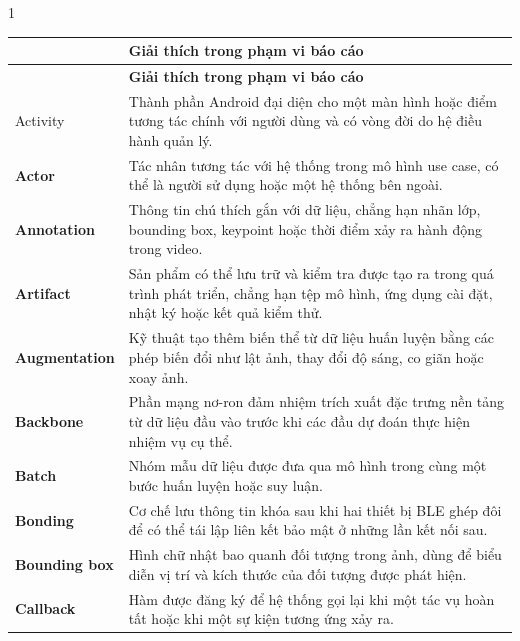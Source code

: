 
\begin{spacing}{1}
\small
\renewcommand{\arraystretch}{1.12}
\begin{longtable}{@{}>{\bfseries\color{HCMUTDarkBlue}}p{4.1cm}p{10.7cm}@{}}
  \toprule
  \multicolumn{1}{@{}l}{\textbf{\color{HCMUTDarkBlue}Thuật ngữ}} &
  \textbf{Giải thích trong phạm vi báo cáo} \\
  \midrule
  \endfirsthead

  \toprule
  \multicolumn{1}{@{}l}{\textbf{\color{HCMUTDarkBlue}Thuật ngữ}} &
  \textbf{Giải thích trong phạm vi báo cáo} \\
  \midrule
  \endhead

  \bottomrule
  \endfoot

  Activity
    & Thành phần Android đại diện cho một màn hình hoặc điểm tương tác chính với người dùng và có vòng đời do hệ điều hành quản lý. \\
  Actor
    & Tác nhân tương tác với hệ thống trong mô hình use case, có thể là người sử dụng hoặc một hệ thống bên ngoài. \\
  Annotation
    & Thông tin chú thích gắn với dữ liệu, chẳng hạn nhãn lớp, bounding box, keypoint hoặc thời điểm xảy ra hành động trong video. \\
  Artifact
    & Sản phẩm có thể lưu trữ và kiểm tra được tạo ra trong quá trình phát triển, chẳng hạn tệp mô hình, ứng dụng cài đặt, nhật ký hoặc kết quả kiểm thử. \\
  Augmentation
    & Kỹ thuật tạo thêm biến thể từ dữ liệu huấn luyện bằng các phép biến đổi như lật ảnh, thay đổi độ sáng, co giãn hoặc xoay ảnh. \\
  Backbone
    & Phần mạng nơ-ron đảm nhiệm trích xuất đặc trưng nền tảng từ dữ liệu đầu vào trước khi các đầu dự đoán thực hiện nhiệm vụ cụ thể. \\
  Batch
    & Nhóm mẫu dữ liệu được đưa qua mô hình trong cùng một bước huấn luyện hoặc suy luận. \\
  Bonding
    & Cơ chế lưu thông tin khóa sau khi hai thiết bị BLE ghép đôi để có thể tái lập liên kết bảo mật ở những lần kết nối sau. \\
  Bounding box
    & Hình chữ nhật bao quanh đối tượng trong ảnh, dùng để biểu diễn vị trí và kích thước của đối tượng được phát hiện. \\
  Callback
    & Hàm được đăng ký để hệ thống gọi lại khi một tác vụ hoàn tất hoặc khi một sự kiện tương ứng xảy ra. \\

\end{longtable}
\end{spacing}
